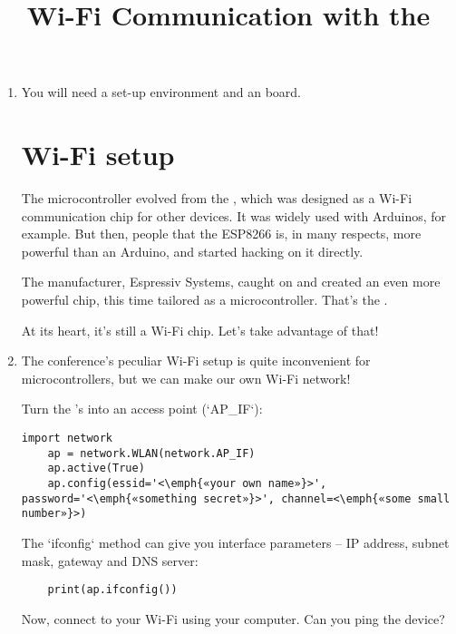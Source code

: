 \documentclass{../tutorial}
\title{Wi-Fi Communication with the \abbr{ESP32}}
\begin{document}
\begin{enumerate}

\item
    You will need a set-up environment and an  board.

\section{Wi-Fi setup}

    The  microcontroller evolved from the ,
    which was designed as a Wi-Fi communication chip for other devices.
    It was widely used with Arduinos, for example.
    But then, people that the ESP8266 is, in many respects, more powerful than
    an Arduino, and started hacking on it directly.

    The  manufacturer, Espressiv Systems, caught on and created
    an even more powerful chip, this time tailored as a microcontroller.
    That's the .

    At its heart, it's still a Wi-Fi chip. Let's take advantage of that!


\item
    The conference's peculiar Wi-Fi setup is quite inconvenient for
    microcontrollers, but we can make our own Wi-Fi network!

    Turn the 's into an access point (`AP_IF`):

    \begin{lstlisting}[escapeinside=<>]
    import network
    ap = network.WLAN(network.AP_IF)
    ap.active(True)
    ap.config(essid='<\emph{«your own name»}>', password='<\emph{«something secret»}>', channel=<\emph{«some small number»}>)
    \end{lstlisting}

    \begin{comment}
        Ideally, run `nmcli d wifi` on your Linux computer to see occupied
        Wi-Fi channels, and pick one you don't see.
    \end{comment}

    The `ifconfig` method can give you interface parameters – IP address,
    subnet mask, gateway and DNS server:

    \begin{lstlisting}
    print(ap.ifconfig())
    \end{lstlisting}

    Now, connect to your Wi-Fi using your computer.
    Can you ping the device?


\end{enumerate}
\end{document}

